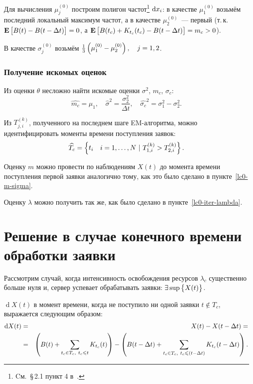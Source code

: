 \documentclass[a4paper,10pt]{article}
\begin{document}
Для вычисления $\mu_j^{(0)}$ построим полигон частот\footnote{%
Cм.~\S\,2.1 пункт 4 в~\cite{ivchmed2010matstat}.
} $\dif x_i$:
в качестве $\mu_1^{(0)}$ возьмём последний локальный максимум частот, 
а в качестве $\mu_2^{(0)}$~--- первый
(т.\,к.~$\mathbf{E}\sbr{B(t) - B(t - \Delta t)} = 0$, 
а $\mathbf{E}\sbr{B(t_c) + K_{t_c}(t_c) - B(t - \Delta t)} = m_c > 0$).

В качестве $\sigma_j^{(0)}$ возьмём $\frac{1}{3}\del{\mu_1^{(0)} - \mu_2^{(0)}}, 
\quad j=1, 2$.

\subsubsection{Получение искомых оценок}
Из оценки $\theta$ несложно найти искомые оценки 
$\sigma^2$, $m_c$, $\sigma_c$:
$$
  \widehat{m_c} = \mu_1, \quad 
  \widehat{\sigma}^2 = \frac{\sigma_2^2}{\Delta t}, \quad
  \widehat{\sigma_c}^2 = \sigma_1^2 - \sigma_2^2.
$$

Из $T_{j,i}^{(k)}$, полученного на последнем шаге EM-алгоритма, 
можно идентифицировать моменты времени поступления заявок:
$$\widehat{T_c} = \cbr{t_i \quad i=1,\ldots,N\ \vert\ 
    T_{1,i}^{(k)} > T_{2,i}^{(k)}}.$$

Оценку $m$ можно провести по наблюдениям $X(t)$ до момента времени поступления
первой заявки аналогично тому, как это было сделано в пункте~\ref{lc0-m-sigma}.

Оценку $\lambda$ можно получить так же, как было сделано 
в пункте~\ref{lc0-iter-lambda}.

\section{Решение в случае конечного времени обработки заявки}
Рассмотрим случай, когда интенсивность освобождения ресурсов $\lambda_c$ 
существенно больше нуля и,
сервер успевает обрабатывать заявки: $\exists \sup\cbr{X(t)}$.

$\operatorname{d}X(t)$ в момент времени, 
когда не поступило ни одной заявки $t \notin T_c$, 
выражается следующим образом:
\begin{eqnarray*}
\dif X(t) 
  & = & X(t) - X(t - \Delta t) = \\
  & = & \del{B(t) + \sum\limits_{t_c \in T_c,\ t_c \leqslant t} K_{t_c}(t)} - 
      \del{B(t - \Delta t) + 
        \sum\limits_{t_c \in T_c,\ t_c \leqslant (t - \Delta t)} 
          K_{t_c}(t - \Delta t)}.
\end{eqnarray*}
\end{document}

